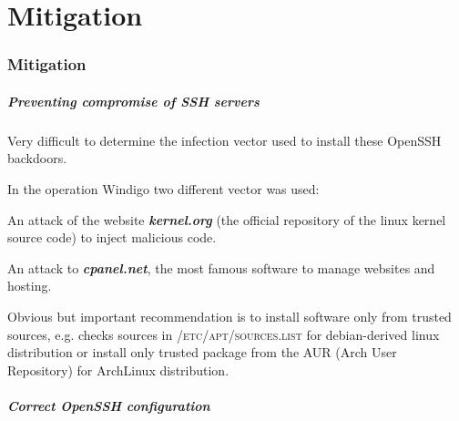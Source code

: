 \part{Mitigation}
\section{Mitigation}

\begin{frame}
	\partpage
\end{frame}

\begin{frame}
	\frametitle{Preventing compromise of SSH servers}
	
	
	Very difficult to determine the infection vector used to install these OpenSSH backdoors.
	
	\medskip
	
	In the operation Windigo two different vector was used: 
	
	\smallskip
	
	An attack of the website \textbf{\textit{kernel.org}} (the official repository of the linux kernel source code) to inject malicious code.
	
	\smallskip
	
	An attack to \textbf{\textit{cpanel.net}}, the most famous software to manage websites and hosting.

  \medskip
  
  Obvious but important recommendation is to install software only from trusted sources, e.g. checks sources in \textsc{/etc/apt/sources.list} for debian-derived linux distribution or install only trusted package from the AUR (Arch User Repository) for ArchLinux distribution. 
  	
\end{frame}


\begin{frame}
	\frametitle{Correct OpenSSH configuration}
\end{frame}


